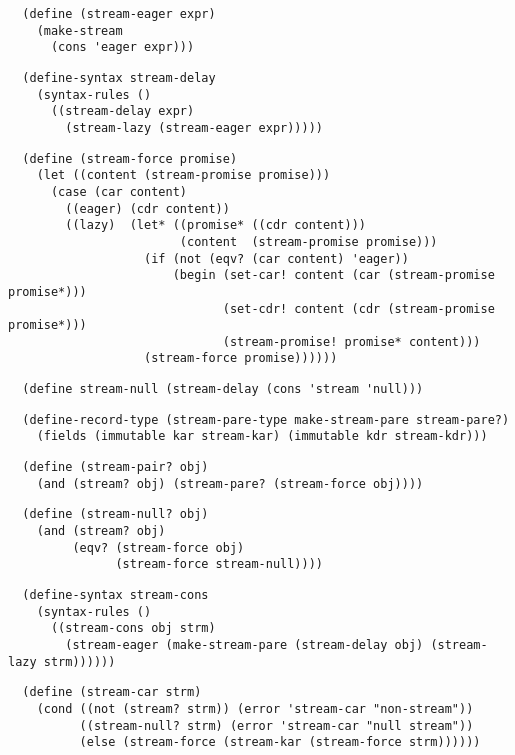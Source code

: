 \begin{verbatim}
  (define (stream-eager expr)
    (make-stream
      (cons 'eager expr)))
\end{verbatim}

\begin{verbatim}
  (define-syntax stream-delay
    (syntax-rules ()
      ((stream-delay expr)
        (stream-lazy (stream-eager expr)))))
\end{verbatim}

\begin{verbatim}
  (define (stream-force promise)
    (let ((content (stream-promise promise)))
      (case (car content)
        ((eager) (cdr content))
        ((lazy)  (let* ((promise* ((cdr content)))
                        (content  (stream-promise promise)))
                   (if (not (eqv? (car content) 'eager))
                       (begin (set-car! content (car (stream-promise promise*)))
                              (set-cdr! content (cdr (stream-promise promise*)))
                              (stream-promise! promise* content)))
                   (stream-force promise))))))
\end{verbatim}

\begin{verbatim}
  (define stream-null (stream-delay (cons 'stream 'null)))
\end{verbatim}

\begin{verbatim}
  (define-record-type (stream-pare-type make-stream-pare stream-pare?)
    (fields (immutable kar stream-kar) (immutable kdr stream-kdr)))
\end{verbatim}

\begin{verbatim}
  (define (stream-pair? obj)
    (and (stream? obj) (stream-pare? (stream-force obj))))
\end{verbatim}

\begin{verbatim}
  (define (stream-null? obj)
    (and (stream? obj)
         (eqv? (stream-force obj)
               (stream-force stream-null))))
\end{verbatim}

\begin{verbatim}
  (define-syntax stream-cons
    (syntax-rules ()
      ((stream-cons obj strm)
        (stream-eager (make-stream-pare (stream-delay obj) (stream-lazy strm))))))
\end{verbatim}

\begin{verbatim}
  (define (stream-car strm)
    (cond ((not (stream? strm)) (error 'stream-car "non-stream"))
          ((stream-null? strm) (error 'stream-car "null stream"))
          (else (stream-force (stream-kar (stream-force strm))))))
\end{verbatim}

